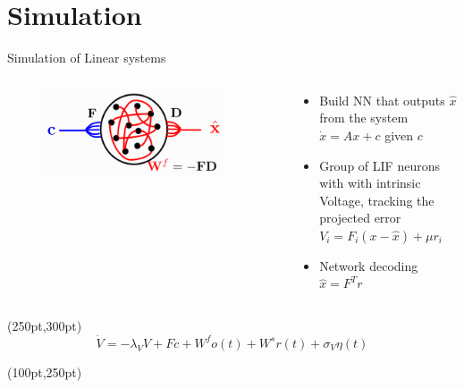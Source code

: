 \documentclass[17pt, t, lualatex]{beamer}
\begin{document}
\section{Simulation}\insertsectionpage
\begin{frame}{Simulation of Linear systems}
	\begin{columns}[T]
		\begin{column}{0.45\textwidth}
			\begin{figure}
				\includegraphics[width=0.9\textwidth]{figures/autoencoder2.png}
			\end{figure}
		\end{column}
		\begin{column}{0.45\textwidth}
			\begin{itemize}
				\item Build NN that outputs $\hat{x}$ from the system $\dot{x} = Ax + c$ given $c$\\
				\item Group of LIF neurons with with intrinsic Voltage, tracking the projected error $V_{i} = F_i(x-\hat{x})+\mu r_{i}$\\
				\item Network decoding $\hat{x} =F^Tr$
			\end{itemize}
		\end{column}
	\end{columns}
	\begin{textblock*}{20pt}(250pt,300pt)
		\begin{equation*}
			\dot{V} = -\lambda_{V}V+Fc+W^{f}o(t)+W^{s}r(t)+\sigma _{V}\eta(t)
		\end{equation*}
	\end{textblock*}

	\begin{textblock*}{20pt}(100pt,250pt)
		\cite{boerlin_predictive_2013}
	\end{textblock*}
\end{frame}
\end{document}
